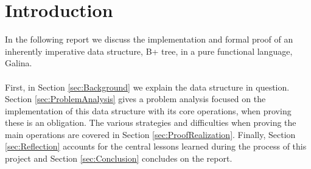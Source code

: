 \section{Introduction}
\label{sec:Introduction}
In the following report we discuss the implementation and formal proof of an inherently imperative data structure, B+ tree, in a pure functional language, Galina. 
\paragraph{}
First, in Section \ref{sec:Background} we explain the data structure in question. Section \ref{sec:ProblemAnalysis} gives a problem analysis focused on the implementation of this data structure with its core operations, when proving these is an obligation. The various strategies and difficulties when proving the main operations are covered in Section \ref{sec:ProofRealization}. Finally, Section \ref{sec:Reflection} accounts for the central lessons learned during the process of this project and Section \ref{sec:Conclusion} concludes on the report.